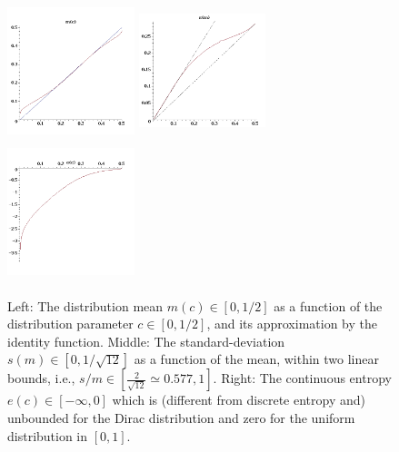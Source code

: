 \documentclass{article}
\begin{document}
\begin{figure}[!ht]
\centerline{
  \includegraphics[width=0.33\textwidth,height=4cm]{img/bcmed1-m}
  \includegraphics[width=0.33\textwidth,height=4cm]{img/bcmed1-s}
  \includegraphics[width=0.33\textwidth,height=4cm]{img/bcmed1-e}
}
  \caption{Left: The distribution mean $m(c) \in [0,1/2]$ as a function of the distribution parameter $c \in [0,1/2]$, and its approximation by the identity function. Middle: The standard-deviation $s(m) \in [0,1/\sqrt{12}]$ as a function of the mean, within two linear bounds, i.e., $s / m \in [\frac{2}{\sqrt{12}} \simeq 0.577, 1]$. Right: The continuous entropy $e(c) \in [-\infty,0]$ which is (different from discrete entropy and) unbounded for the Dirac distribution and zero for the uniform distribution in $[0, 1]$.}
  \label{bcmed1}
\end{figure}

\clearpage{\scriptsize  }
\end{document}

